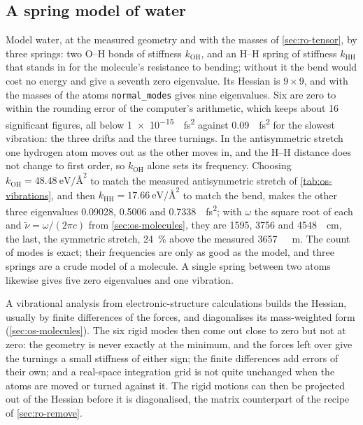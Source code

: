 \subsection*{A spring model of water}

Model water, at the measured geometry and with the masses of
\cref{sec:ro-tensor}, by three springs: two O--H bonds of stiffness
$k_{\mathrm{OH}}$, and an H--H spring of stiffness $k_{\mathrm{HH}}$ that
stands in for the molecule's resistance to bending; without it the bend
would cost no energy and give a seventh zero eigenvalue. Its Hessian is
$9\times9$, and with the masses of the atoms \texttt{normal\_modes} gives
nine eigenvalues. Six are zero to within the rounding error of the computer's
arithmetic, which keeps about 16 significant figures, all
below \SI{1e-15}{\per\femto\second\squared} against
\SI{0.09}{\per\femto\second\squared} for the slowest vibration: the three
drifts and the three turnings. In the antisymmetric
stretch one hydrogen atom moves out as the other moves in, and the H--H
distance does not change to first order, so $k_{\mathrm{OH}}$ alone sets
its frequency. Choosing $k_{\mathrm{OH}} = \SI{48.48}{\electronvolt\per
\angstrom\squared}$ to match the measured antisymmetric stretch of
\cref{tab:os-vibrations}, and then $k_{\mathrm{HH}} =
\SI{17.66}{\electronvolt\per\angstrom\squared}$ to match the bend, makes
the other three eigenvalues 0.09028, 0.5006 and
\SI{0.7338}{\per\femto\second\squared}; with $\omega$ the square root of
each and $\tilde\nu = \omega/(2\pi c)$ from \cref{sec:os-molecules}, they
are 1595, 3756 and \SI{4548}{\per\centi\metre}, the last, the symmetric
stretch, \SI{24}{\percent} above the measured \SI{3657}{\per\centi
\metre}. The count of modes is exact; their
frequencies are only as good as the model, and three springs are a crude
model of a molecule. A single spring between two atoms likewise gives five
zero eigenvalues and one vibration.

\begin{bridge}
A vibrational analysis from electronic-structure calculations builds the
Hessian, usually by finite differences of the forces, and diagonalises its
mass-weighted form (\cref{sec:os-molecules}). The six rigid modes then come
out close to zero but not at zero: the geometry is never exactly at the
minimum, and the forces left over give the turnings a small stiffness of
either sign; the finite differences add errors of their own; and a
real-space integration grid is not quite unchanged when the atoms are
moved or turned against it. The rigid motions can then be
projected out of the Hessian before it is diagonalised, the matrix
counterpart of the recipe of \cref{sec:ro-remove}.
\end{bridge}

